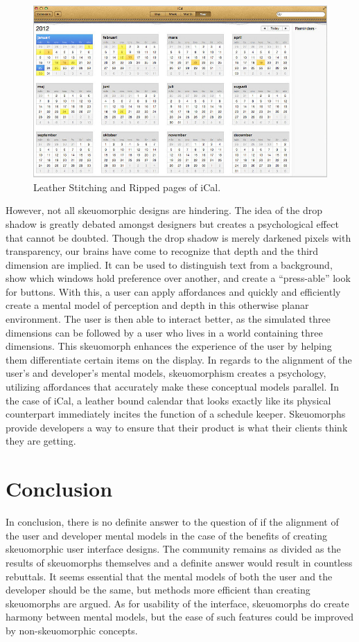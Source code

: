 \documentclass[12pt onesided letterpaper]{report}
\begin{document}
\begin{figure}
    \centering
    \includegraphics[scale = 0.5]{ical}
    \caption{Leather Stitching and Ripped pages of iCal. \cite{carr12}}
    
\end{figure}
\pagebreak


However, not all skeuomorphic designs are hindering.  The idea of the drop shadow is greatly debated amongst designers but creates a psychological effect that cannot be doubted.  Though the drop shadow is merely darkened pixels with transparency, our brains have come to recognize that depth and the third dimension are implied.  It can be used to distinguish text from a background, show which windows hold preference over another, and create a “press-able” look for buttons.  With this, a user can apply affordances and quickly and efficiently create a mental model of perception and depth in this otherwise planar environment.  The user is then able to interact better, as the simulated three dimensions can be followed by a user who lives in a world containing three dimensions.  This skeuomorph enhances the experience of the user by helping them differentiate certain items on the display.  In regards to the alignment of the user’s and developer’s mental models, skeuomorphism creates a psychology, utilizing affordances that accurately make these conceptual models parallel.  In the case of iCal, a leather bound calendar that looks exactly like its physical counterpart immediately incites the function of a schedule keeper.  Skeuomorphs provide developers a way to ensure that their product is what their clients think they are getting. 


\section*{Conclusion}
In conclusion, there is no definite answer to the question of if the alignment of the user and developer mental models in the case of the benefits of creating skeuomorphic user interface designs.  The community remains as divided as the results of skeuomorphs themselves and a definite answer would result in countless rebuttals.  It seems essential that the mental models of both the user and the developer should be the same, but methods more efficient than creating skeuomorphs are argued.   As for usability of the interface, skeuomorphs do create harmony between mental models, but the ease of such features could be improved by non-skeuomorphic concepts. 
\end{document}
